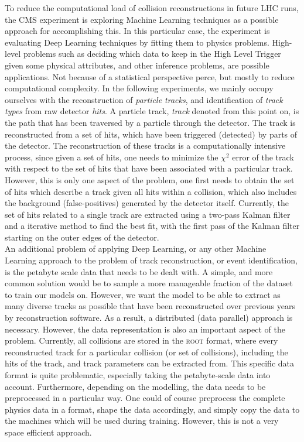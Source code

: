 To reduce the computational load of collision reconstructions in future LHC runs, the CMS experiment is exploring Machine Learning techniques as a possible approach for accomplishing this. In this particular case, the experiment is evaluating Deep Learning techniques by fitting them to physics problems. High-level problems such as deciding which data to keep in the High Level Trigger given some physical attributes, and other inference problems, are possible applications. Not because of a statistical perspective perce, but mostly to reduce computational complexity. In the following experiments, we mainly occupy ourselves with the reconstruction of \emph{particle tracks}, and identification of \emph{track types} from raw detector \emph{hits}. A particle track, \emph{track} denoted from this point on, is the path that has been traversed by a particle through the detector. The track is reconstructed from a set of hits, which have been triggered (detected) by parts of the detector. The reconstruction of these tracks is a computationally intensive process, since given a set of hits, one needs to minimize the $\chi^2$ error of the track with respect to the set of hits that have been associated with a particular track. However, this is only one aspect of the problem, one first needs to obtain the set of hits which describe a track given all hits within a collision, which also includes the background (false-positives) generated by the detector itself. Currently, the set of hits related to a single track are extracted using a two-pass Kalman filter and a iterative method to find the best fit, with the first pass of the Kalman filter starting on the outer edges of the detector.\\

An additional problem of applying Deep Learning, or any other Machine Learning approach to the problem of track reconstruction, or event identification, is the petabyte scale data that needs to be dealt with. A simple, and more common solution would be to sample a more manageable fraction of the dataset to train our models on. However, we want the model to be able to extract as many diverse tracks as possible that have been reconstructed over previous years by reconstruction software. As a result, a distributed (data parallel) approach is necessary. However, the data representation is also an important aspect of the problem. Currently, all collisions are stored in the \textsc{root} format, where every reconstructed track for a particular collision (or set of collisions), including the hits of the track, and track parameters can be extracted from. This specific data format is quite problematic, especially taking the petabyte-scale data into account. Furthermore, depending on the modelling, the data needs to be preprocessed in a particular way. One could of course preprocess the complete physics data in a format, shape the data accordingly, and simply copy the data to the machines which will be used during training. However, this is not a very space efficient approach.\\

